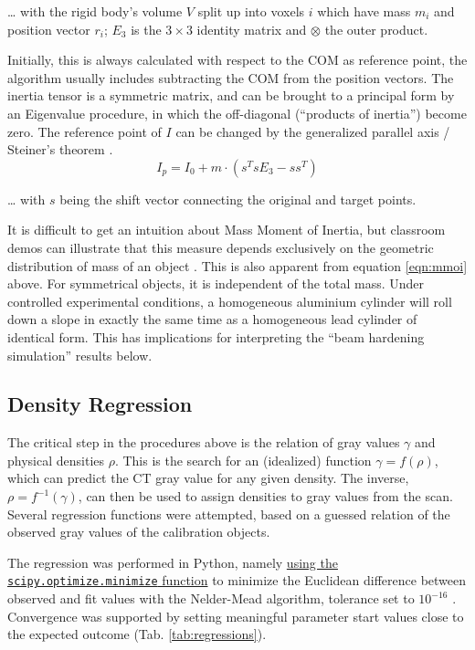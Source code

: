 \ldots{} with the rigid body's volume \(V\) split up into voxels \(i\) which have mass \(m_i\) and position vector \(r_{i}\); \(E_{3}\) is the \(3\times 3\) identity matrix and \(\otimes\) the outer product.

Initially, this is always calculated with respect to the COM as reference point, the algorithm usually includes subtracting the COM from the position vectors.
The inertia tensor is a symmetric matrix, and can be brought to a principal form by an Eigenvalue procedure, in which the off-diagonal (``products of inertia'') become zero.
The reference point of \(I\) can be changed by the generalized parallel axis / Steiner's theorem \citep[][p. 245]{Lynch2017}.
\begin{equation}\label{eqn:steiner}
 I_{p} = I_{0} + m \cdot \left( s^{T} s E_{3} - s s^{T} \right)
\end{equation}

\ldots{} with \(s\) being the shift vector connecting the original and target points.


It is difficult to get an intuition about Mass Moment of Inertia, but classroom demos can illustrate that this measure depends exclusively on the geometric distribution of mass of an object \citep{Lewin801L19,LewinMOI}.
This is also apparent from equation \eqref{eqn:mmoi} above.
For symmetrical objects, it is independent of the total mass.
Under controlled experimental conditions, a homogeneous aluminium cylinder will roll down a slope in exactly the same time as a homogeneous lead cylinder of identical form.
This has implications for interpreting the ``beam hardening simulation'' results below.


\subsection{Density Regression}
\label{sec:org5133e45}
The critical step in the procedures above is the relation of gray values \(\gamma\) and physical densities \(\rho\).
This is the search for an (idealized) function \(\gamma = f(\rho )\), which can predict the CT gray value for any given density.
The inverse, \(\rho = f^{-1}(\gamma )\), can then be used to assign densities to gray values from the scan.
Several regression functions were attempted, based on a guessed relation of the observed gray values of the calibration objects.

The regression was performed in Python, namely \href{https://docs.scipy.org/doc/scipy/reference/generated/scipy.optimize.minimize.html}{using the \texttt{scipy.optimize.minimize} function} to minimize the Euclidean difference between observed and fit values with the Nelder-Mead algorithm, tolerance set to \(10^{-16}\) \citep{Gao2012}.
Convergence was supported by setting meaningful parameter start values close to the expected outcome (Tab. \ref{tab:regressions}).


